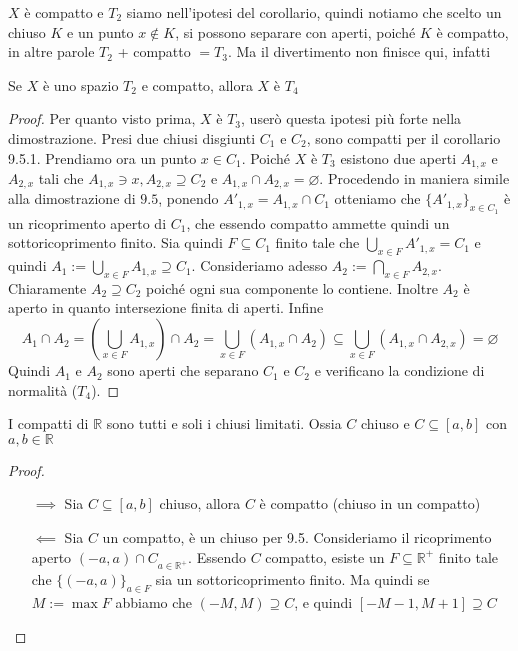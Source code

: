 \(X\) è compatto e \(T_{2}\) siamo nell'ipotesi del corollario, quindi
notiamo che scelto un chiuso \(K\) e un punto \(x \not\in K\), si possono
separare con aperti, poiché \(K\) è compatto, in altre parole \(T_{2}\) +
compatto \(= T_{3}\). Ma il divertimento non finisce qui, infatti
\begin{proposition}
    Se \(X\) è uno spazio \(T_{2}\) e compatto, allora \(X\) è \(T_{4}\) 
\end{proposition}
\begin{proof}
    Per quanto visto prima, \(X\) è \(T_{3}\), userò questa ipotesi più forte
    nella dimostrazione.
    Presi due chiusi disgiunti \(C_{1}\) e \(C_{2}\), sono compatti per il corollario
    9.5.1.
    Prendiamo ora un punto \(x \in C_{1}\). Poiché \(X\) è \(T_{3}\) esistono
    due aperti \(A_{1, x}\) e \(A_{2, x}\) tali che \(A_{1, x} \ni x, A_{2, x}
    \supseteq C_{2} \) e \(A_{1,x} \cap A_{2, x} = \varnothing\). Procedendo in
    maniera simile alla dimostrazione di \(9.5\), ponendo \(A'_{1, x} = A_{1, x}
    \cap C_{1}\) otteniamo che \(\{A'_{1, x}\}_{x \in C_{1}} \) è un
    ricoprimento aperto di \(C_{1}\), che essendo compatto ammette quindi un
    sottoricoprimento finito. Sia quindi \(F \subseteq C_{1} \) finito tale che
    \(\bigcup_{x \in F} A'_{1, x} = C_{1}\) e quindi
    \(A_1 := \bigcup_{x \in F} A_{1, x} \supseteq C_{1} \). Consideriamo adesso
    \(A_{2} := \bigcap_{x \in F} A_{2, x}\). Chiaramente \(A_{2} \supseteq C_{2}
    \) poiché ogni sua componente lo contiene. Inoltre \(A_{2}\) è aperto in
    quanto intersezione finita di aperti. Infine
    \[
        A_{1} \cap A_{2} = \left( \bigcup_{x \in F} A_{1, x} \right) \cap A_{2}
        = \bigcup_{x \in F} \left( A_{1, x} \cap A_{2} \right) \subseteq
        \bigcup_{x \in F} \left( A_{1, x} \cap A_{2, x} \right) = \varnothing
    \]
    Quindi \(A_{1}\) e \(A_{2}\) sono aperti che separano \(C_{1}\) e \(C_{2}\)
    e verificano la condizione di normalità (\(T_{4}\)).
\end{proof}
\begin{proposition}
    I compatti di \(\mathbb{R}\) sono tutti e soli i chiusi limitati. Ossia
    \(C\) chiuso e \(C \subseteq [a, b] \) con \(a, b \in \mathbb{R}\) 
\end{proposition}
\begin{proof}\( \)
\begin{itemize}
    \item[\(\implies \)] Sia \(C \subseteq [a, b] \) chiuso, allora \(C\) è
        compatto (chiuso in un compatto)
    \item[\(\impliedby \)] Sia \(C\) un compatto, è un chiuso per 9.5. Consideriamo il ricoprimento
        aperto \({(-a, a) \cap C}_{a \in \mathbb{R}^{+}}\). Essendo \(C\)
        compatto, esiste un \(F \subseteq \mathbb{R}^{+} \) finito tale che
        \(\{(-a, a)\}_{a \in F}\) sia un sottoricoprimento finito. Ma quindi se
        \(M := \max F\) abbiamo che \((-M, M) \supseteq C \), e quindi \([-M-1,
        M+1] \supseteq C \) 
\end{itemize}
\end{proof}
